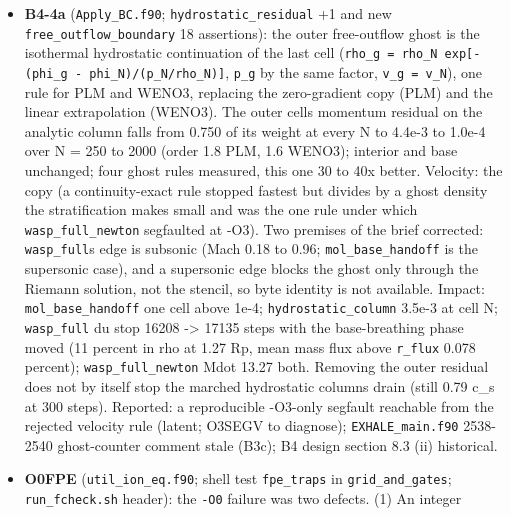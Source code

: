 \documentclass[english,a4paper]{my_memo}
\begin{document}
\begin{itemize}
  its outputs written; a capped or plateaued run exits 0. \texttt{wasp\_full\_newton}
  now exits 2 with \texttt{info\ =\ 2}; \texttt{run\_check.sh} never reads the status. Advisor:
  \texttt{run\_newton.sh} and \texttt{run\_baseline.sh} (set -e loops) now report a status
  2 instead of aborting. Open: the \texttt{EXHALE\_PTC=1} route stops before the
  certification and so claims a stationary state with no verdict (B5).
\item
  \textbf{B4-4a} (\texttt{Apply\_BC.f90}; \texttt{hydrostatic\_residual} +1 and new
  \texttt{free\_outflow\_boundary} 18 assertions): the outer free-outflow ghost is the
  isothermal hydrostatic continuation of the last cell (\texttt{rho\_g\ =\ rho\_N\ exp{[}-(phi\_g\ -\ phi\_N)/(p\_N/rho\_N){]}}, \texttt{p\_g} by the same factor, \texttt{v\_g\ =\ v\_N}),
  one rule for PLM and WENO3, replacing the zero-gradient copy (PLM) and the
  linear extrapolation (WENO3). The outer cell\textquotesingle s momentum residual on the
  analytic column falls from 0.750 of its weight at every N to 4.4e-3 to
  1.0e-4 over N = 250 to 2000 (order 1.8 PLM, 1.6 WENO3); interior and base
  unchanged; four ghost rules measured, this one 30 to 40x better. Velocity:
  the copy (a continuity-exact rule stopped fastest but divides by a ghost
  density the stratification makes small and was the one rule under which
  \texttt{wasp\_full\_newton} segfaulted at -O3). Two premises of the brief
  corrected: \texttt{wasp\_full}\textquotesingle s edge is subsonic (Mach 0.18 to 0.96;
  \texttt{mol\_base\_handoff} is the supersonic case), and a supersonic edge blocks
  the ghost only through the Riemann solution, not the stencil, so byte
  identity is not available. Impact: \texttt{mol\_base\_handoff} one cell above 1e-4;
  \texttt{hydrostatic\_column} 3.5e-3 at cell N; \texttt{wasp\_full} du stop 16208 -\textgreater{} 17135
  steps with the base-breathing phase moved (11 percent in rho at 1.27 Rp,
  mean mass flux above \texttt{r\_flux} 0.078 percent); \texttt{wasp\_full\_newton} Mdot
  13.27 both. Removing the outer residual does not by itself stop the
  marched hydrostatic column\textquotesingle s drain (still 0.79 c\_s at 300 steps). Reported:
  a reproducible -O3-only segfault reachable from the rejected velocity rule
  (latent; O3SEGV to diagnose); \texttt{EXHALE\_main.f90} 2538-2540 ghost-counter
  comment stale (B3c); B4 design section 8.3 (ii) historical.
\item
  \textbf{O0FPE} (\texttt{util\_ion\_eq.f90}; shell test \texttt{fpe\_traps} in \texttt{grid\_and\_gates};
  \texttt{run\_fcheck.sh} header): the \texttt{-O0} failure was two defects. (1) An integer

\end{itemize}
\end{document}
